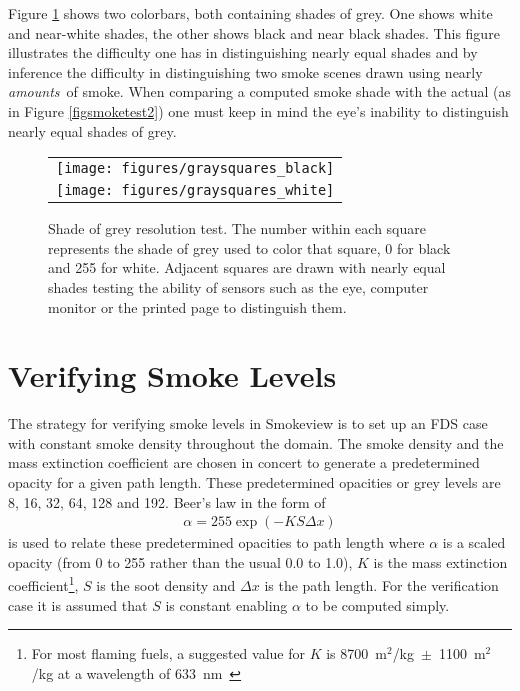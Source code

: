 \documentclass[11pt,twoside]{book}
\newcommand{\figoptions}{hbp}
\begin{document}
Figure \ref{figgraysquare} shows two colorbars, both containing shades of grey.  One shows white and
near-white shades, the other shows black and near black shades.  This figure illustrates the difficulty one has in distinguishing nearly equal shades and by inference the difficulty in distinguishing two smoke scenes drawn using nearly {\em amounts}\ of smoke.  When comparing a computed smoke shade with the actual (as in Figure \ref{figsmoketest2}) one must keep in mind the eye's inability to distinguish nearly equal shades of grey.

\begin{figure}[\figoptions]
\begin{center}
 \centering
\begin{tabular}{c}
\texttt{[image: figures/graysquares\_black]}\\
\texttt{[image: figures/graysquares\_white]}\\
 \end{tabular}
\end{center}
 \caption[Shade of grey resolution test.]{Shade of grey resolution test.
 The number within each square represents the shade of grey used to color that square,
 0 for black and 255 for white.  Adjacent squares are drawn with nearly equal shades
 testing the ability of sensors such as the eye, computer monitor or the printed page
 to distinguish them.
 }
\label{figgraysquare}%
\end{figure}

\section{Verifying Smoke Levels}
The strategy for verifying smoke levels in Smokeview is to set up an FDS case with constant smoke density throughout the domain.  The smoke density and the mass extinction coefficient are chosen in concert to generate a predetermined opacity for a given path length.   These predetermined opacities or grey levels are 8, 16, 32, 64, 128 and 192.  Beer's law in the form of
\begin{eqnarray*}
\alpha = 255\exp(-KS\Delta x)
\end{eqnarray*}
is used to relate these predetermined opacities to path length where $\alpha$ is a scaled opacity (from 0 to 255 rather than the usual 0.0 to 1.0),
$K$ is the mass extinction coefficient\footnote{For most flaming fuels, a suggested value for $K$ is
8700~m$^2$/kg~$\pm$~1100~m$^2$/kg at a
wavelength of 633~nm~\cite{Mulholland:F+M}},
$S$ is the soot density and $\Delta x$ is the path length.  For the verification case it is assumed that $S$ is constant enabling $\alpha$ to be computed simply.
\end{document}
